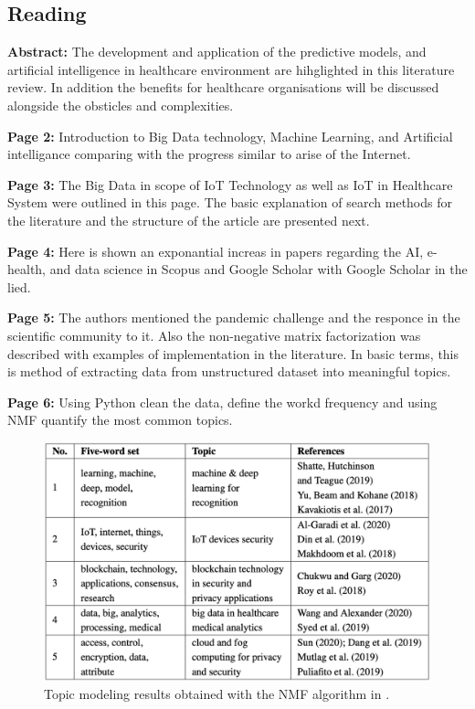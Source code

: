 \subsection{Reading}
    \textbf{Abstract:}
    The development and application of the predictive models, and artificial intelligence in healthcare environment are hihglighted in this literature review. In addition the benefits for healthcare organisations will be discussed alongside the obsticles and complexities.
    
    \textbf{Page 2:}
    Introduction to Big Data technology, Machine Learning, and Artificial intelligance comparing with the progress similar to arise of the Internet.
    
    \textbf{Page 3:}
    The Big Data in scope of IoT Technology as well as IoT in Healthcare System were outlined in this page. The basic explanation of search methods for the literature and the structure of the article are presented next.
    
    \textbf{Page 4:}
    Here is shown an exponantial increas in papers regarding the AI, e-health, and data science in Scopus and Google Scholar with Google Scholar in the lied.
    
    \textbf{Page 5:}
    The authors mentioned the pandemic challenge and the responce in the scientific community to it. Also the non-negative matrix factorization was described with examples of implementation in the literature. In basic terms, this is method of extracting data from unstructured dataset into meaningful topics.
    
    \textbf{Page 6:}
    Using Python clean the data, define the workd frequency and using NMF quantify the most common topics.
    \begin{figure}[H]
        \centering
        \includegraphics[width=1\textwidth]{figures/0008_SR01ES23/fig1.png}
        \caption{Topic modeling results obtained with the NMF algorithm in \cite{x249}.}
        \label{fig1:0008_SR01ES23}
    \end{figure}
    
